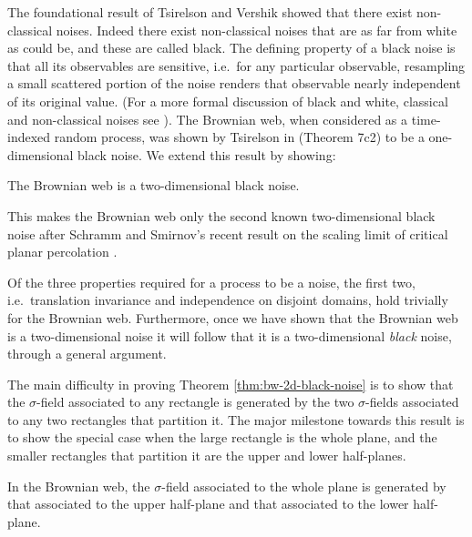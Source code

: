 {The foundational result of Tsirelson and Vershik \cite{tsirelson-vershik} showed that there
exist non-classical noises.  Indeed there exist non-classical noises
that are as far from white as could be, and these are called black.  The
defining property of a black noise is that all its observables are
sensitive, i.e.\ for any particular observable, resampling
a small scattered portion of the noise
renders that observable nearly independent of its original
value.  (For a more formal discussion of black and white, classical
and non-classical noises see \cite{tsirelson-nonclassical-stochastic-flows}).
The Brownian web,
when considered as a time-indexed random process,
was shown by Tsirelson in
\cite{tsirelson-scaling-limit-noise-stability} (Theorem 7c2)
to be a one-dimensional black noise.  We
extend this
result by showing:

\begin{theorem}
\label{thm:bw-2d-black-noise}
The Brownian web is a
two-dimensional black noise.
\end{theorem}

This makes the Brownian web only the second
known two-dimensional black noise after Schramm and Smirnov's
recent result on the scaling limit of critical planar
percolation \cite{schramm-smirnov}.

Of the three properties required for a process to be a noise, the
first two, i.e.\ translation invariance and independence on disjoint
domains, hold trivially for the Brownian web.  Furthermore, once we
have shown that the Brownian web is a two-dimensional noise it will
follow that it is a two-dimensional \emph{black} noise,
through a general argument.

The main difficulty in proving
Theorem \ref{thm:bw-2d-black-noise} is to show that the $\sigma$-field
associated to any rectangle is generated by the two $\sigma$-fields
associated to any two rectangles that partition it.
The major milestone towards this result is to show the special case
when the large rectangle is the whole plane, and the smaller
rectangles that partition it are the upper and lower half-planes.

\begin{theorem}
\label{thm:informal-recovering-from-half-planes}
In the Brownian web, the $\sigma$-field associated to the whole plane
is generated by that associated to the upper half-plane and that
associated to the lower half-plane.
\end{theorem}

}
